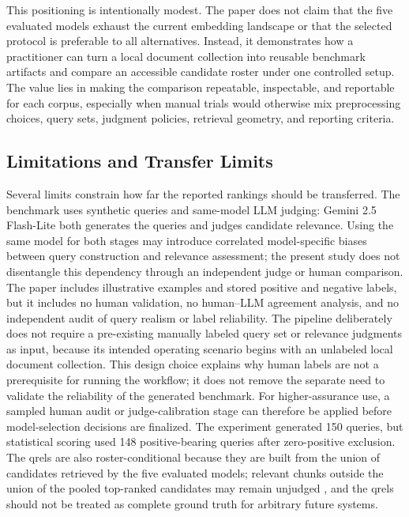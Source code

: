 This positioning is intentionally modest. The paper does not claim that the five evaluated models exhaust the current embedding landscape or that the selected protocol is preferable to all alternatives. Instead, it demonstrates how a practitioner can turn a local document collection into reusable benchmark artifacts and compare an accessible candidate roster under one controlled setup. The value lies in making the comparison repeatable, inspectable, and reportable for each corpus, especially when manual trials would otherwise mix preprocessing choices, query sets, judgment policies, retrieval geometry, and reporting criteria.

\subsection{Limitations and Transfer Limits}\label{discussion-validity-transfer-limits}

Several limits constrain how far the reported rankings should be transferred. The benchmark uses synthetic queries and same-model LLM judging: Gemini 2.5 Flash-Lite both generates the queries and judges candidate relevance. Using the same model for both stages may introduce correlated model-specific biases between query construction and relevance assessment; the present study does not disentangle this dependency through an independent judge or human comparison. The paper includes illustrative examples and stored positive and negative labels, but it includes no human validation, no human--LLM agreement analysis, and no independent audit of query realism or label reliability. The pipeline deliberately does not require a pre-existing manually labeled query set or relevance judgments as input, because its intended operating scenario begins with an unlabeled local document collection. This design choice explains why human labels are not a prerequisite for running the workflow; it does not remove the separate need to validate the reliability of the generated benchmark. For higher-assurance use, a sampled human audit or judge-calibration stage can therefore be applied before model-selection decisions are finalized. The experiment generated 150 queries, but statistical scoring used 148 positive-bearing queries after zero-positive exclusion. The qrels are also roster-conditional because they are built from the union of candidates retrieved by the five evaluated models; relevant chunks outside the union of the pooled top-ranked candidates may remain unjudged \citep{zobel1998reliable, buckley2004retrieval}, and the qrels should not be treated as complete ground truth for arbitrary future systems.

